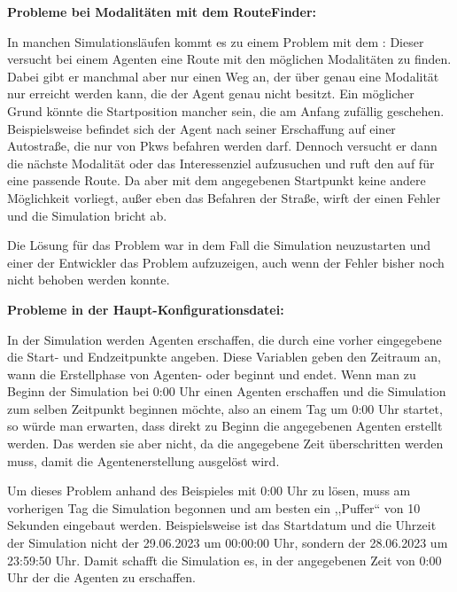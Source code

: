 \textbf{Probleme bei Modalitäten mit dem RouteFinder:}

In manchen Simulationsläufen kommt es zu einem Problem mit dem : Dieser versucht bei einem Agenten eine Route mit den möglichen Modalitäten zu finden.
Dabei gibt er manchmal aber nur einen Weg an, der über genau eine Modalität nur erreicht werden kann, die der Agent genau nicht besitzt.
Ein möglicher Grund könnte die Startposition mancher  sein, die am Anfang zufällig geschehen.
Beispielsweise befindet sich der Agent nach seiner Erschaffung auf einer Autostraße, die nur von Pkws befahren werden darf.
Dennoch versucht er dann die nächste Modalität oder das Interessenziel aufzusuchen und ruft den  auf für eine passende Route.
Da aber mit dem angegebenen Startpunkt keine andere Möglichkeit vorliegt, außer eben das Befahren der Straße, wirft der  einen Fehler und die Simulation bricht ab.

Die Lösung für das Problem war in dem Fall die Simulation neuzustarten und einer der Entwickler das Problem aufzuzeigen, auch wenn der Fehler bisher noch nicht behoben werden konnte.

\textbf{Probleme in der Haupt-Konfigurationsdatei:}

In der Simulation werden Agenten erschaffen, die durch eine vorher eingegebene  die Start- und Endzeitpunkte angeben.
Diese Variablen geben den Zeitraum an, wann die Erstellphase von Agenten- oder beginnt und endet.
Wenn man zu Beginn der Simulation bei 0:00 Uhr einen Agenten erschaffen und die Simulation zum selben Zeitpunkt beginnen möchte, also an einem Tag um 0:00 Uhr startet, so würde man erwarten, dass direkt zu Beginn die angegebenen Agenten erstellt werden.
Das werden sie aber nicht, da die angegebene Zeit überschritten werden muss, damit die Agentenerstellung ausgelöst wird.

Um dieses Problem anhand des Beispieles mit 0:00 Uhr zu lösen, muss am vorherigen Tag die Simulation begonnen und am besten ein ,,Puffer`` von 10 Sekunden eingebaut werden.
Beispielsweise ist das Startdatum und die Uhrzeit der Simulation nicht der 29.06.2023 um 00:00:00 Uhr, sondern der 28.06.2023 um 23:59:50 Uhr.
Damit schafft die Simulation es, in der angegebenen Zeit von 0:00 Uhr der  die Agenten zu erschaffen.
